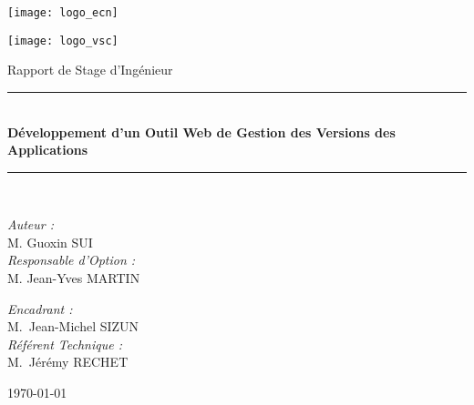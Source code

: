 \begin{titlepage}

 \noindent
 \begin{minipage}{0.3\textwidth}
  \begin{flushleft} \large
   \texttt{[image: logo\_ecn]}\\[1cm]
  \end{flushleft}
 \end{minipage}%
 \hfill
 \begin{minipage}{0.3\textwidth}
  \begin{flushright} \large
   \texttt{[image: logo\_vsc]}\\[1cm]
  \end{flushright}
 \end{minipage}

 \begin{center}
  \vskip 2cm

   {\large Rapport de Stage d'Ingénieur}\\[0.5cm]

  \rule{\linewidth}{0.5mm} \\[0.4cm]
  { \huge \bfseries Développement d’un Outil Web de Gestion des Versions des Applications \\[0.4cm] }
  \rule{\linewidth}{0.5mm} \\[1.5cm]

  \noindent
  \begin{minipage}{0.4\textwidth}
   \begin{flushleft} \large
    \emph{Auteur :}\\
    M. Guoxin \textsc{SUI}\\
    \bigbreak
    \emph{Responsable d'Option :}\\
    M. Jean-Yves \textsc{MARTIN}\\
   \end{flushleft}
  \end{minipage}%
  \hfill
  \begin{minipage}{0.4\textwidth}
   \begin{flushright} \large
    \emph{Encadrant :} \\
    M.~Jean-Michel \textsc{SIZUN}\\
    \bigbreak
    \emph{Référent Technique :}\\
    M.~Jérémy \textsc{RECHET}
   \end{flushright}
  \end{minipage}

  \vfill

  {\large \today}

 \end{center}
\end{titlepage}

